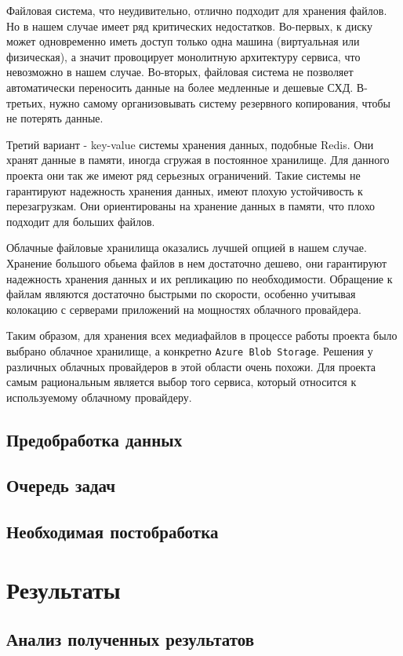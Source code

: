 Файловая система, что неудивительно, отлично подходит для хранения файлов. Но в нашем случае имеет ряд критических недостатков. Во-первых, к диску может одновременно иметь доступ только одна машина (виртуальная или физическая), а значит провоцирует монолитную архитектуру сервиса, что невозможно в нашем случае. Во-вторых, файловая система не позволяет автоматически переносить данные на более медленные и дешевые СХД. В-третьих, нужно самому организовывать систему резервного копирования, чтобы не потерять данные.

Третий вариант - key-value системы хранения данных, подобные Redis. Они хранят данные в памяти, иногда сгружая в постоянное хранилище. Для данного проекта они так же имеют ряд серьезных ограничений. Такие системы не гарантируют надежность хранения данных, имеют плохую устойчивость к перезагрузкам. Они ориентированы на хранение данных в памяти, что плохо подходит для больших файлов.

Облачные файловые хранилища оказались лучшей опцией в нашем случае. Хранение большого обьема файлов в нем достаточно дешево, они гарантируют надежность хранения данных и их репликацию по необходимости. Обращение к файлам являются достаточно быстрыми по скорости, особенно учитывая колокацию с серверами приложений на мощностях облачного провайдера.

Таким образом, для хранения всех медиафайлов в процессе работы проекта было выбрано облачное хранилище, а конкретно \texttt{Azure Blob Storage}. Решения у различных облачных провайдеров в этой области очень похожи. Для проекта самым рациональным является выбор того сервиса, который относится к используемому облачному провайдеру.

\subsection{Предобработка данных}

\subsection{Очередь задач}

\subsection{Необходимая постобработка}

\section{Результаты}

\subsection{Анализ полученных результатов}

